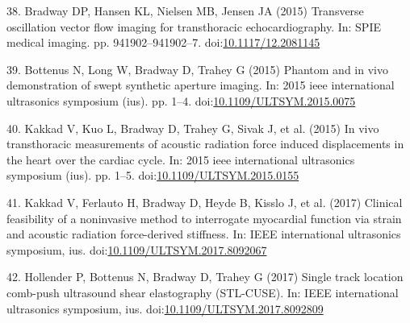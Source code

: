 \documentclass[
]{article}
\newenvironment{cslreferences}%
  {}%
  {\par}
\begin{document}
\begin{cslreferences}
\leavevmode\hypertarget{ref-Bradway2015}{}%
38. Bradway DP, Hansen KL, Nielsen MB, Jensen JA (2015) Transverse
oscillation vector flow imaging for transthoracic echocardiography. In:
SPIE medical imaging. pp. 941902--941902--7.
doi:\href{https://doi.org/10.1117/12.2081145}{10.1117/12.2081145}

\leavevmode\hypertarget{ref-Bottenus2015}{}%
39. Bottenus N, Long W, Bradway D, Trahey G (2015) Phantom and in vivo
demonstration of swept synthetic aperture imaging. In: 2015 ieee
international ultrasonics symposium (ius). pp. 1--4.
doi:\href{https://doi.org/10.1109/ULTSYM.2015.0075}{10.1109/ULTSYM.2015.0075}

\leavevmode\hypertarget{ref-Kakkad2015}{}%
40. Kakkad V, Kuo L, Bradway D, Trahey G, Sivak J, et al. (2015) In vivo
transthoracic measurements of acoustic radiation force induced
displacements in the heart over the cardiac cycle. In: 2015 ieee
international ultrasonics symposium (ius). pp. 1--5.
doi:\href{https://doi.org/10.1109/ULTSYM.2015.0155}{10.1109/ULTSYM.2015.0155}

\leavevmode\hypertarget{ref-Kakkad2017}{}%
41. Kakkad V, Ferlauto H, Bradway D, Heyde B, Kisslo J, et al. (2017)
Clinical feasibility of a noninvasive method to interrogate myocardial
function via strain and acoustic radiation force-derived stiffness. In:
IEEE international ultrasonics symposium, ius.
doi:\href{https://doi.org/10.1109/ULTSYM.2017.8092067}{10.1109/ULTSYM.2017.8092067}

\leavevmode\hypertarget{ref-Hollender2017}{}%
42. Hollender P, Bottenus N, Bradway D, Trahey G (2017) Single track
location comb-push ultrasound shear elastography (STL-CUSE). In: IEEE
international ultrasonics symposium, ius.
doi:\href{https://doi.org/10.1109/ULTSYM.2017.8092809}{10.1109/ULTSYM.2017.8092809}
\end{cslreferences}
\end{document}
